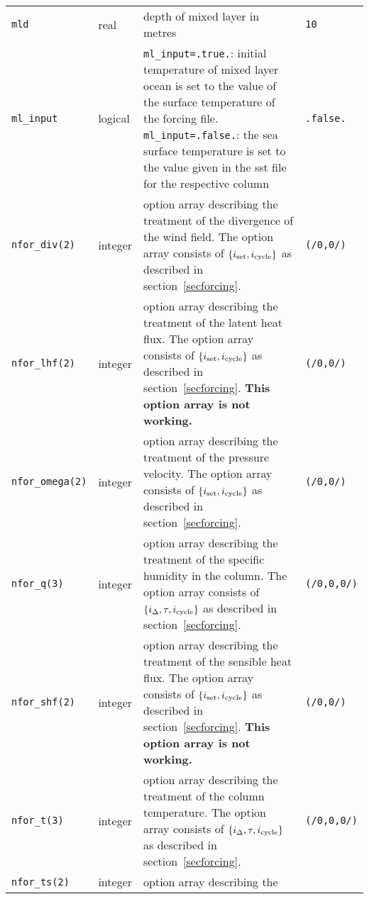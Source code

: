 \begin{longtable}{l@{\extracolsep\fill}lp{5.0cm}p{3.0cm}}
{\tt mld}\index{namelist variables!mld} 
 & real & depth of mixed layer in metres & {\tt 10}\\
{\tt ml\_input}\index{namelist variables!ml\_input}
 & logical & {\tt ml\_input=.true.}: initial
temperature of mixed layer ocean is set to the value of the surface
temperature of the forcing file. {\tt ml\_input=.false.}: the sea
surface temperature is set to the value
given in the \echam{} sst file for the respective column & {\tt .false.}\\
{\tt nfor\_div(2)}\index{namelist variables!nfor\_div}
       &integer & option array describing the
treatment of the divergence of the wind field. The option array consists of
$\{i_{\rm set},i_{\rm cycle}\}$ as described in section~\ref{secforcing}. & {\tt (/0,0/)} \\
{\tt nfor\_lhf(2)}\index{namelist variables!nfor\_lhf}
       &integer & option array describing the
treatment of the latent heat flux. The option array consists of
$\{i_{\rm set},i_{\rm cycle}\}$ as described in section~\ref{secforcing}. {\bf This option
  array is not working.} & {\tt (/0,0/)} \\
{\tt nfor\_omega(2)}\index{namelist variables!nfor\_omega}
       &integer & option array describing the
treatment of the pressure velocity. The option array consists of
$\{i_{\rm set},i_{\rm cycle}\}$ as described in section~\ref{secforcing}. & {\tt (/0,0/)} \\
{\tt nfor\_q(3)}\index{namelist variables!nfor\_q}
        &integer   &option array describing the
treatment of the specific humidity in the column. The option array consists of
$\{i_\Delta,\tau,i_{\rm cycle}\}$ as described in section~\ref{secforcing}.
                                 &   {\tt (/0,0,0/)}  \\  
{\tt nfor\_shf(2)}\index{namelist variables!nfor\_shf}
       &integer & option array describing the
treatment of the sensible heat flux. The option array consists of
$\{i_{\rm set},i_{\rm cycle}\}$ as described in section~\ref{secforcing}. {\bf This option
  array is not working.} & {\tt (/0,0/)} \\
{\tt nfor\_t(3)}\index{namelist variables!nfor\_t}
        &integer   & option array describing the
treatment of the column temperature. The option array consists of
$\{i_\Delta,\tau,i_{\rm cycle}\}$ as described in section~\ref{secforcing}. 
                                 &   {\tt (/0,0,0/)}  \\ 
{\tt nfor\_ts(2)}\index{namelist variables!nfor\_ts}
       &integer & option array describing the

\end{longtable}
